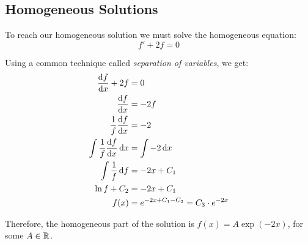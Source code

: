 \subsection*{Homogeneous Solutions}

    To reach our homogeneous solution we must solve the homogeneous equation:
    \[
        f' + 2f = 0
    \]

    Using a common technique called \textit{separation of variables}, we get:
    \begin{align*}
        \dv{f}{x} + 2 f &= 0 \\
        \dv{f}{x} &= -2 f \\
        \frac{1}{f} \dv{f}{x} &= -2 \\
        \int \frac{1}{f} \dv{f}{x} \dd{x} &= \int -2 \dd{x} \\
        \int \frac{1}{f} \dd{f} &= -2 x + C_1 \\
        \ln f + C_2 &= -2 x + C_1 \\
        f(x) &= e^{-2x + C_1 - C_2} = C_3 \cdot e^{-2x}
    \end{align*}

    Therefore, the homogeneous part of the solution is $f(x) = A \exp(-2x)$, for some $A \in \operatorname{\mathbb{R}}$.
